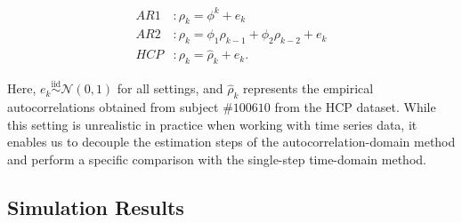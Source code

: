\documentclass[latex/main.tex]{subfiles}
\begin{document}
\begin{align}
    \textit{AR1}&: \rho_k = \phi^k + e_k\\
    \textit{AR2}&: \rho_k = \phi_1\rho_{k-1} + \phi_2\rho_{k-2} + e_k\\
    \textit{HCP}&: \rho_k = \hat\rho_k + e_k.
\end{align}

\noindent Here, $e_k \overset{\text{iid}}{\sim} \mathcal{N}(0, 1)$ for all settings, and $\hat\rho_k$ represents the empirical autocorrelations obtained from subject $\#100610$ from the HCP dataset. While this setting is unrealistic in practice when working with time series data, it enables us to decouple the estimation steps of the autocorrelation-domain method and perform a specific comparison with the single-step time-domain method.

\subsection{Simulation Results}
\end{document}
